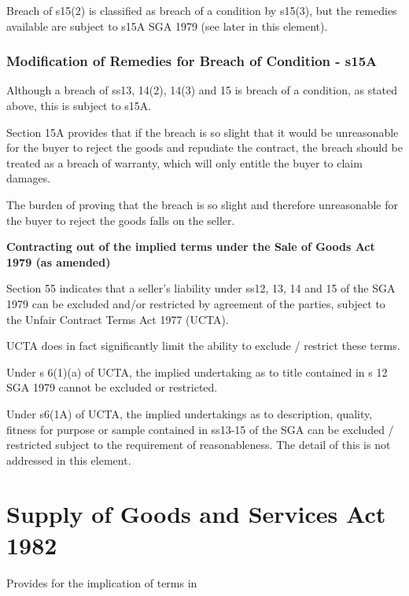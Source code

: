 \documentclass[
]{article}
\begin{document}
Breach of s15(2) is classified as breach of a condition by s15(3), but
the remedies available are subject to s15A SGA 1979 (see later in this
element).

\hypertarget{modification-of-remedies-for-breach-of-condition---s15a}{%
\subsubsection{Modification of Remedies for Breach of Condition -
s15A}\label{modification-of-remedies-for-breach-of-condition---s15a}}

Although a breach of ss13, 14(2), 14(3) and 15 is breach of a condition,
as stated above, this is subject to s15A.

Section 15A provides that if the breach is so slight that it would be
unreasonable for the buyer to reject the goods and repudiate the
contract, the breach should be treated as a breach of warranty, which
will only entitle the buyer to claim damages.

The burden of proving that the breach is so slight and therefore
unreasonable for the buyer to reject the goods falls on the seller.

\textbf{Contracting out of the implied terms under the Sale of Goods Act
1979 (as amended)}

Section 55 indicates that a seller's liability under ss12, 13, 14 and 15
of the SGA 1979 can be excluded and/or restricted by agreement of the
parties, subject to the Unfair Contract Terms Act 1977 (UCTA).

UCTA does in fact significantly limit the ability to exclude / restrict
these terms.

Under s 6(1)(a) of UCTA, the implied undertaking as to title contained
in s 12 SGA 1979 cannot be excluded or restricted.

Under s6(1A) of UCTA, the implied undertakings as to description,
quality, fitness for purpose or sample contained in ss13-15 of the SGA
can be excluded / restricted subject to the requirement of
reasonableness. The detail of this is not addressed in this element.

\hypertarget{supply-of-goods-and-services-act-1982}{%
\section{Supply of Goods and Services Act
1982}\label{supply-of-goods-and-services-act-1982}}

Provides for the implication of terms in
\end{document}
